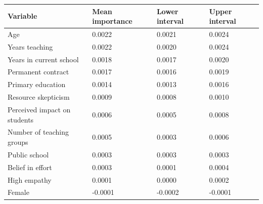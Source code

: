 \begin{tabular}{llll}
\toprule
Variable & Mean importance & Lower interval & Upper interval\\
\midrule
Age & 0.0022 & 0.0021 & 0.0024\\
Years teaching & 0.0022 & 0.0020 & 0.0024\\
Years in current school & 0.0018 & 0.0017 & 0.0020\\
Permanent contract & 0.0017 & 0.0016 & 0.0019\\
Primary education & 0.0014 & 0.0013 & 0.0016\\
\addlinespace
Resource skepticism & 0.0009 & 0.0008 & 0.0010\\
Perceived impact on students & 0.0006 & 0.0005 & 0.0008\\
Number of teaching groups & 0.0005 & 0.0003 & 0.0006\\
Public school & 0.0003 & 0.0003 & 0.0003\\
Belief in effort & 0.0003 & 0.0001 & 0.0004\\
\addlinespace
High empathy & 0.0001 & 0.0000 & 0.0002\\
Female & -0.0001 & -0.0002 & -0.0001\\
\bottomrule
\end{tabular}
